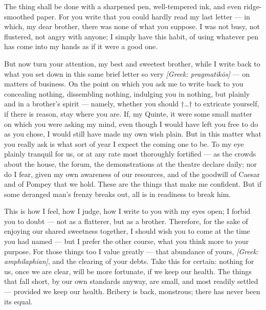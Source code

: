 

 The thing shall be done with a sharpened pen, well-tempered ink, and even ridge-smoothed paper. For you write that you could hardly read my last letter --- in which, my dear brother, there was none of what you suppose. I was not busy, not flustered, not angry with anyone; I simply have this habit, of using whatever pen has come into my hands as if it were a good one.

 But now turn your attention, my best and sweetest brother, while I write back to what you set down in this same brief letter so very \textit{[Greek: pragmatikōs]} --- on matters of business. On the point on which you ask me to write back to you concealing nothing, dissembling nothing, indulging you in nothing, but plainly and in a brother's spirit --- namely, whether you should †\dots† to extricate yourself, if there is reason, stay where you are. If, my Quinte, it were some small matter on which you were asking my mind, even though I would have left you free to do as you chose, I would still have made my own wish plain. But in this matter what you really ask is what sort of year I expect the coming one to be. To my eye plainly tranquil for us, or at any rate most thoroughly fortified --- as the crowds about the house, the forum, the demonstrations at the theatre declare daily; nor do I fear, given my own awareness of our resources, and of the goodwill of Caesar and of Pompey that we hold. These are the things that make me confident. But if some deranged man's frenzy breaks out, all is in readiness to break him.

 This is how I feel, how I judge, how I write to you with my eyes open; I forbid you to doubt --- not as a flatterer, but as a brother. Therefore, for the sake of enjoying our shared sweetness together, I should wish you to come at the time you had named --- but I prefer the other course, what you think more to your purpose. For those things too I value greatly --- that abundance of yours, \textit{[Greek: amphilaphian]}, and the clearing of your debts. Take this for certain: nothing for us, once we are clear, will be more fortunate, if we keep our health. The things that fall short, by our own standards anyway, are small, and most readily settled --- provided we keep our health. Bribery is back, monstrous; there has never been its equal.

